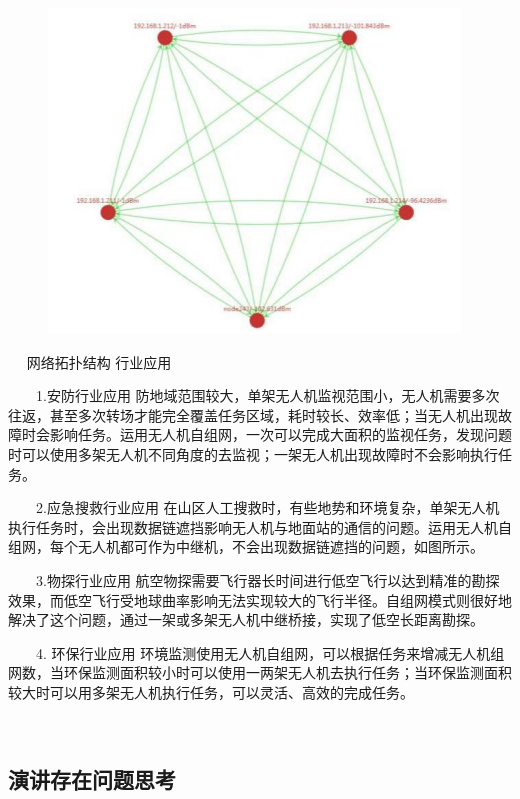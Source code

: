 \documentclass{article}
\begin{document}
\par
\begin{figure}[h!]
\centering
\includegraphics[scale=0.5]{10}
\label{fig:10}
\end{figure}
　
网络拓扑结构
行业应用\par
　　1.安防行业应用 防地域范围较大，单架无人机监视范围小，无人机需要多次往返，甚至多次转场才能完全覆盖任务区域，耗时较长、效率低；当无人机出现故障时会影响任务。运用无人机自组网，一次可以完成大面积的监视任务，发现问题时可以使用多架无人机不同角度的去监视；一架无人机出现故障时不会影响执行任务。\par
　　2.应急搜救行业应用 在山区人工搜救时，有些地势和环境复杂，单架无人机执行任务时，会出现数据链遮挡影响无人机与地面站的通信的问题。运用无人机自组网，每个无人机都可作为中继机，不会出现数据链遮挡的问题，如图所示。\par
　　3.物探行业应用 航空物探需要飞行器长时间进行低空飞行以达到精准的勘探效果，而低空飞行受地球曲率影响无法实现较大的飞行半径。自组网模式则很好地解决了这个问题，通过一架或多架无人机中继桥接，实现了低空长距离勘探。\par
　　4. 环保行业应用 环境监测使用无人机自组网，可以根据任务来增减无人机组网数，当环保监测面积较小时可以使用一两架无人机去执行任务；当环保监测面积较大时可以用多架无人机执行任务，可以灵活、高效的完成任务。\par
　　\subsection{演讲存在问题思考}
\end{document}
